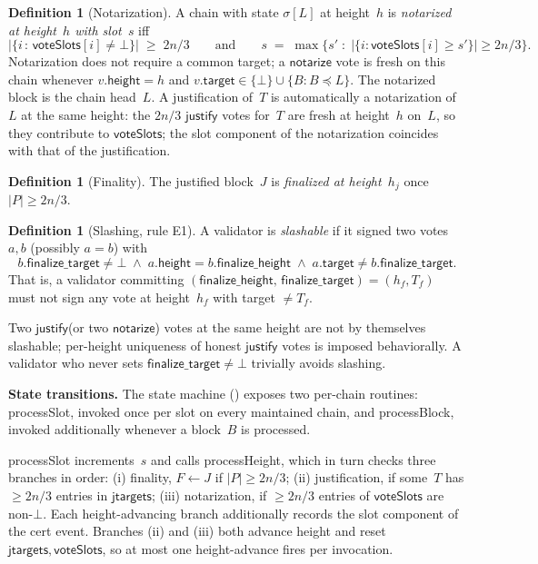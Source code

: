 \ifx\litemode\undefined\documentclass{article}\fi
\newcommand{\target}{\mathsf{target}}
\newcommand{\height}{\mathsf{height}}
\newcommand{\just}{\ensuremath{\mathsf{justify}}\xspace}
\newcommand{\notar}{\ensuremath{\mathsf{notarize}}\xspace}
\newcommand{\finalizeHeight}{\mathsf{finalize\_height}}
\newcommand{\finalizeTarget}{\mathsf{finalize\_target}}
\newcommand{\jtargets}{\mathsf{jtargets}}
\newcommand{\voteSlots}{\mathsf{voteSlots}}
\newcommand{\processSlot}{\textsf{processSlot}\xspace}
\newcommand{\processBlock}{\textsf{processBlock}\xspace}
\newcommand{\processHeight}{\textsf{processHeight}\xspace}
\renewcommand{\paragraph}[1]{\vspace{7pt}\noindent\textbf{#1}}
\theoremstyle{plain}
\theoremstyle{definition}
\newtheorem{definition}[theorem]{Definition}
\theoremstyle{remark}
\begin{document}
\begin{definition}[Notarization]\label{def:notarization}
A chain with state $\sigma[L]$ at height~$h$ is \emph{notarized at height~$h$ with slot~$s$} iff
\[
  \bigl|\{i \,:\, \voteSlots[i] \neq \bot\}\bigr| \;\geq\; 2n/3
  \qquad\text{and}\qquad
  s \;=\; \max\bigl\{s' \;:\; |\{i : \voteSlots[i] \geq s'\}| \geq 2n/3\bigr\}.
\]
Notarization does not require a common target; a \notar vote is fresh on this chain whenever $v.\height = h$ and $v.\target \in \{\bot\} \cup \{B : B \preceq L\}$. The notarized block is the chain head~$L$.
A justification of~$T$ is automatically a notarization of~$L$ at the same height: the $2n/3$ \just votes for~$T$ are fresh at height~$h$ on~$L$, so they contribute to $\voteSlots$; the slot component of the notarization coincides with that of the justification.
\end{definition}

\begin{definition}[Finality]\label{def:finality}
The justified block~$J$ is \emph{finalized at height~$h_j$} once $|P| \geq 2n/3$.
\end{definition}

\begin{definition}[Slashing, rule E1]\label{def:slashing}
A validator is \emph{slashable} if it signed two votes~$a, b$ (possibly $a = b$) with
\[
  b.\finalizeTarget \neq \bot \;\wedge\; a.\height = b.\finalizeHeight \;\wedge\; a.\target \neq b.\finalizeTarget.
\]
That is, a validator committing $(\finalizeHeight,\, \finalizeTarget) = (h_f, T_f)$ must not sign any vote at height~$h_f$ with target $\neq T_f$.
\end{definition}

Two \just (or two \notar) votes at the same height are not by themselves slashable; per-height uniqueness of honest \just votes is imposed behaviorally.
A validator who never sets $\finalizeTarget \neq \bot$ trivially avoids slashing.

\paragraph{State transitions.}
The state machine () exposes two per-chain routines: \processSlot, invoked once per slot on every maintained chain, and \processBlock, invoked additionally whenever a block~$B$ is processed.

\processSlot increments~$s$ and calls \processHeight, which in turn checks three branches in order: (i) finality, $F \gets J$ if $|P| \geq 2n/3$; (ii) justification, if some~$T$ has $\geq 2n/3$ entries in $\jtargets$; (iii) notarization, if $\geq 2n/3$ entries of $\voteSlots$ are non-$\bot$. Each height-advancing branch additionally records the slot component of the cert event.
Branches (ii) and (iii) both advance height and reset $\jtargets, \voteSlots$, so at most one height-advance fires per invocation.
\end{document}
